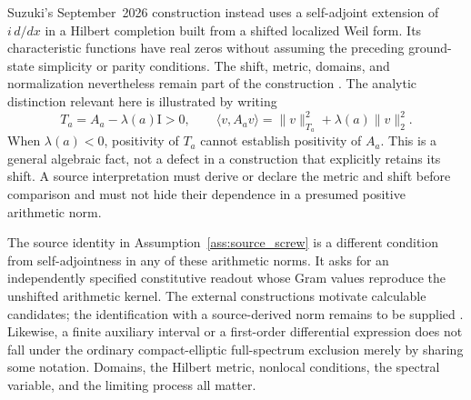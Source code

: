 \documentclass[11pt,letterpaper]{article}
\numberwithin{equation}{section}
\theoremstyle{definition}
\theoremstyle{remark}
\newcommand{\Id}{\mathrm I}
\begin{document}
Suzuki's September~2026 construction instead uses a self-adjoint extension of $i\,d/dx$ in a Hilbert completion built from a shifted localized Weil form. Its characteristic functions have real zeros without assuming the preceding ground-state simplicity or parity conditions. The shift, metric, domains, and normalization nevertheless remain part of the construction \cite[Theorem~1.5]{suzuki2026}. The analytic distinction relevant here is illustrated by writing
\begin{equation}
 T_a=A_a-\lambda(a)\Id>0,
 \qquad
 \langle v,A_av\rangle=\|v\|_{T_a}^2+\lambda(a)\|v\|_2^2.
 \label{eq:weil_metric_shift}
\end{equation}
When $\lambda(a)<0$, positivity of $T_a$ cannot establish positivity of $A_a$. This is a general algebraic fact, not a defect in a construction that explicitly retains its shift. A source interpretation must derive or declare the metric and shift before comparison and must not hide their dependence in a presumed positive arithmetic norm.

The source identity in Assumption~\ref{ass:source_screw} is a different condition from self-adjointness in any of these arithmetic norms. It asks for an independently specified constitutive readout whose Gram values reproduce the unshifted arithmetic kernel. The external constructions motivate calculable candidates; the identification with a source-derived norm remains to be supplied \cite{tcgsoperator}. Likewise, a finite auxiliary interval or a first-order differential expression does not fall under the ordinary compact-elliptic full-spectrum exclusion merely by sharing some notation. Domains, the Hilbert metric, nonlocal conditions, the spectral variable, and the limiting process all matter.
\end{document}

